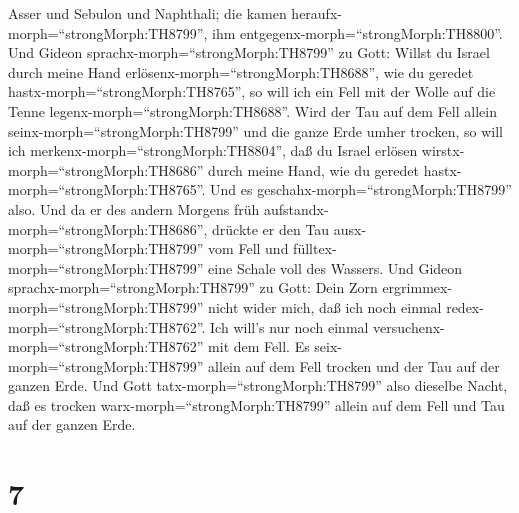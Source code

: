 Asser und Sebulon und Naphthali; die kamen
heraufx-morph=``strongMorph:TH8799'', ihm
entgegenx-morph=``strongMorph:TH8800''.  Und Gideon
sprachx-morph=``strongMorph:TH8799'' zu Gott: Willst du Israel durch
meine Hand erlösenx-morph=``strongMorph:TH8688'', wie du geredet
hastx-morph=``strongMorph:TH8765'',  so will ich ein Fell
mit der Wolle auf die Tenne legenx-morph=``strongMorph:TH8688''. Wird
der Tau auf dem Fell allein seinx-morph=``strongMorph:TH8799'' und die
ganze Erde umher trocken, so will ich
merkenx-morph=``strongMorph:TH8804'', daß du Israel erlösen
wirstx-morph=``strongMorph:TH8686'' durch meine Hand, wie du geredet
hastx-morph=``strongMorph:TH8765''.  Und es
geschahx-morph=``strongMorph:TH8799'' also. Und da er des andern Morgens
früh aufstandx-morph=``strongMorph:TH8686'', drückte er den Tau
ausx-morph=``strongMorph:TH8799'' vom Fell und
fülltex-morph=``strongMorph:TH8799'' eine Schale voll des Wassers.
 Und Gideon sprachx-morph=``strongMorph:TH8799'' zu Gott:
Dein Zorn ergrimmex-morph=``strongMorph:TH8799'' nicht wider mich, daß
ich noch einmal redex-morph=``strongMorph:TH8762''. Ich will's nur noch
einmal versuchenx-morph=``strongMorph:TH8762'' mit dem Fell. Es
seix-morph=``strongMorph:TH8799'' allein auf dem Fell trocken und der
Tau auf der ganzen Erde.  Und Gott
tatx-morph=``strongMorph:TH8799'' also dieselbe Nacht, daß es trocken
warx-morph=``strongMorph:TH8799'' allein auf dem Fell und Tau auf der
ganzen Erde.

\hypertarget{section-6}{%
\section{7}\label{section-6}}

